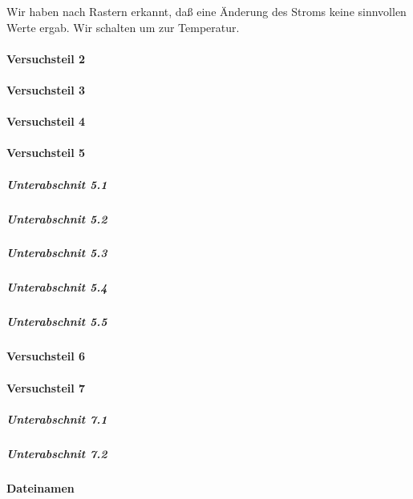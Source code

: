 \documentclass{subfiles}
\begin{document}
                Wir haben nach Rastern erkannt, daß eine Änderung des Stroms keine sinnvollen Werte ergab. Wir schalten um zur Temperatur.
            

        \paragraph*{Versuchsteil 2}
                

            
        \paragraph*{Versuchsteil 3}


        \paragraph*{Versuchsteil 4}

        
        \paragraph*{Versuchsteil 5}

            \subparagraph*{Unterabschnit 5.1}

            \subparagraph*{Unterabschnit 5.2}

            \subparagraph*{Unterabschnit 5.3}

            \subparagraph*{Unterabschnit 5.4}

            \subparagraph*{Unterabschnit 5.5}
    
            
        \paragraph*{Versuchsteil 6}

        
        \paragraph*{Versuchsteil 7}

            \subparagraph*{Unterabschnit 7.1}

            \subparagraph*{Unterabschnit 7.2}
            

        \paragraph*{Dateinamen}
\end{document}
